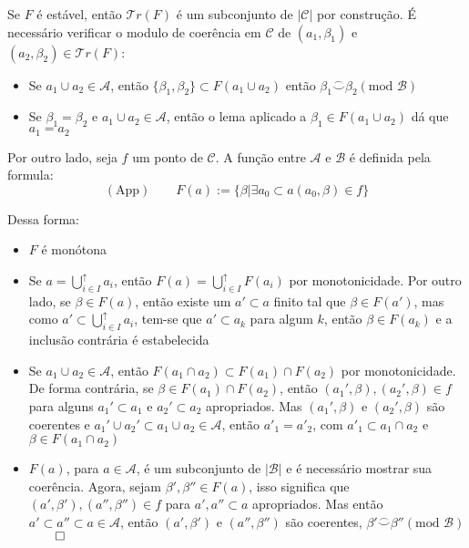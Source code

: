 \documentclass[../main.tex]{subfiles}
\begin{document}
Se $F$ é estável, então $\mathcal{T}r(F)$ é um subconjunto de $|\mathcal{C}|$ por construção. É necessário verificar o modulo de coerência em $\mathcal{C}$ de $(a_1, \beta_1)$ e $(a_2, \beta_2) \in \mathcal{T}r(F)$:
\begin{itemize}
    \item Se $a_1 \cup a_2 \in \mathcal{A}$, então $\{\beta_1, \beta_2\} \subset F(a_1 \cup a_2)$ então $\beta_1 \stackrel{\frown}{\smile} \beta_2 (\text{mod } \mathcal{B})$
    \item Se $\beta_1 = \beta_2$ e $a_1 \cup a_2 \in \mathcal{A}$, então o lema aplicado a $\beta_1 \in F(a_1 \cup a_2)$ dá que $a_1 = a_2$
\end{itemize}

Por outro lado, seja $f$ um ponto de $\mathcal{C}$. A função entre $\mathcal{A}$ e $\mathcal{B}$ é definida pela formula:
$$(\text{App}) \qquad F(a) := \{\beta | \exists a_0 \subset a (a_0, \beta) \in f\}$$

Dessa forma:
\begin{itemize}
    \item $F$ é monótona
    \item Se $a = \bigcup^{\uparrow}_{i \in I} a_i$, então $F(a) = \bigcup^{\uparrow}_{i \in I} F(a_i)$ por monotonicidade. Por outro lado, se $\beta \in F(a)$, então existe um $a' \subset a$ finito tal que $\beta \in F(a')$, mas como $a' \subset \bigcup^{\uparrow}_{i \in I} a_i$, tem-se que $a' \subset a_k$ para algum $k$, então $\beta \in F(a_k)$ e a inclusão contrária é estabelecida
    \item Se $a_1 \cup a_2 \in \mathcal{A}$, então $F(a_1 \cap a_2) \subset F(a_1) \cap F(a_2)$ por monotonicidade. De forma contrária, se $\beta \in F(a_1) \cap F(a_2)$, então $(a_1', \beta), (a_2', \beta) \in f$ para alguns $a_1' \subset a_1$ e $a_2' \subset a_2$ apropriados. Mas $(a_1', \beta)$ e $(a_2', \beta)$ são coerentes e $a_1' \cup a_2' \subset a_1 \cup a_2 \in \mathcal{A}$, então $a'_1 = a'_2$, com $a'_1 \subset a_1 \cap a_2$ e $\beta \in F(a_1 \cap a_2)$
    \item $F(a)$, para $a \in \mathcal{A}$, é um subconjunto de $|\mathcal{B}|$ e é necessário mostrar sua coerência. Agora, sejam $\beta', \beta'' \in F(a)$, isso significa que $(a', \beta'), (a'', \beta'') \in f$ para $a', a'' \subset a$ apropriados. Mas então $a' \subset a'' \subset a \in \mathcal{A}$, então $(a', \beta')$ e $(a'', \beta'')$ são coerentes, $\beta' \stackrel{\frown}{\smile} \beta'' (\text{mod } \mathcal{B})$ $\qed$
\end{itemize}
\end{document}
